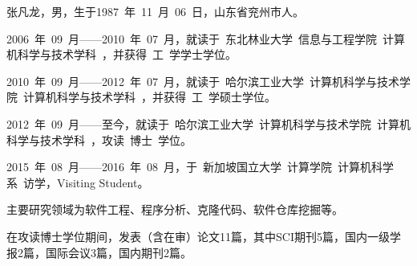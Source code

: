


张凡龙，男，生于1987~年~11~月~06~日，山东省兖州市人。

2006~年~09~月------2010~年~07~月，就读于~东北林业大学~信息与工程学院~计算机科学与技术学科~，并获得~工~学学士学位。

2010~年~09~月------2012~年~07~月，就读于~哈尔滨工业大学~计算机科学与技术学院~计算机科学与技术学科~，并获得~工~学硕士学位。

2012~年~09~月------至今，就读于~哈尔滨工业大学~计算机科学与技术学院~计算机科学与技术学科~，攻读~博士~学位。

2015~年~08~月------2016~年~08~月，于~新加坡国立大学~计算学院~计算机科学系~访学，Visiting Student。



主要研究领域为软件工程、程序分析、克隆代码、软件仓库挖掘等。

在攻读博士学位期间，发表（含在审）论文11篇，其中SCI期刊5篇，国内一级学报2篇，国际会议3篇，国内期刊2篇。%

\vspace{3em}\noindent
